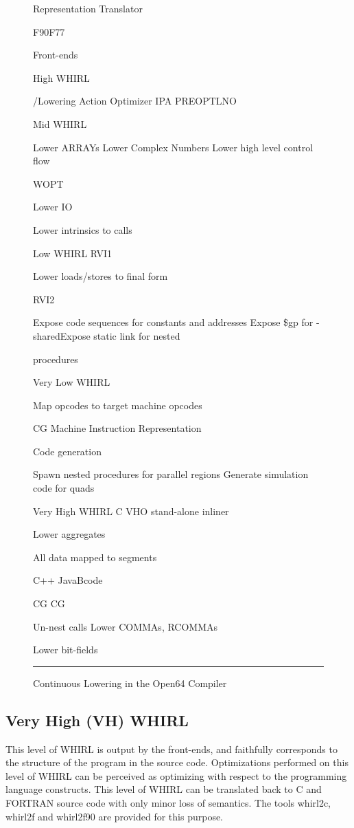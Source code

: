 \documentclass{article}
\begin{document}
\begin{figure}

Representation Translator

F90F77

Front-ends

High WHIRL

/Lowering Action Optimizer IPA PREOPTLNO

Mid WHIRL

Lower ARRAYs Lower Complex Numbers Lower high level control flow

WOPT

Lower IO

Lower intrinsics to calls

Low WHIRL RVI1

Lower loads/stores to final form

RVI2

Expose code sequences for constants and addresses Expose \$gp for
-sharedExpose static link for nested

procedures

Very Low WHIRL

Map opcodes to target machine opcodes

CG Machine Instruction Representation

Code generation

Spawn nested procedures for parallel regions Generate simulation
code for quads

Very High WHIRL C VHO stand-alone inliner

Lower aggregates

All data mapped to segments

C++ JavaBcode

CG CG

Un-nest calls Lower COMMAs, RCOMMAs

Lower bit-fields

\hrule
\caption{Continuous Lowering in the Open64 Compiler}
\end{figure}

\subsection{Very High (VH) WHIRL}

This level of WHIRL is output by the front-ends, and faithfully
corresponds to the structure of the program in the source code.
Optimizations performed on this level of WHIRL can be perceived as optimizing
with respect to the programming language constructs. This level of
WHIRL can be translated back to C and FORTRAN source code with only
minor loss of semantics. The tools whirl2c, whirl2f and whirl2f90
are provided for this purpose. 
\end{document}
